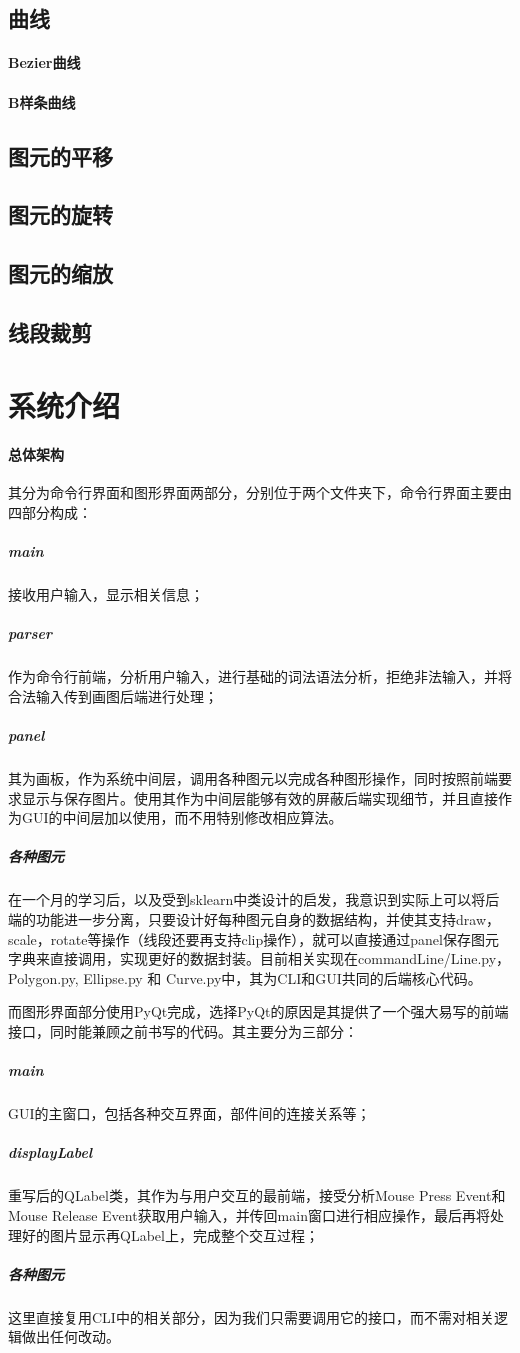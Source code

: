 \documentclass[a4paper,UTF8]{article}
\theoremstyle{definition}
\begin{document}
\subsection{曲线}
\paragraph{Bezier曲线}
\paragraph{B样条曲线}
\subsection{图元的平移}
\subsection{图元的旋转}
\subsection{图元的缩放}
\subsection{线段裁剪}
\section{系统介绍}
\paragraph{总体架构} 其分为命令行界面和图形界面两部分，分别位于两个文件夹下，命令行界面主要由四部分构成：
\subparagraph{main} 接收用户输入，显示相关信息；
\subparagraph{parser} 作为命令行前端，分析用户输入，进行基础的词法语法分析，拒绝非法输入，并将合法输入传到画图后端进行处理；
\subparagraph{panel} 其为画板，作为系统中间层，调用各种图元以完成各种图形操作，同时按照前端要求显示与保存图片。使用其作为中间层能够有效的屏蔽后端实现细节，并且直接作为GUI的中间层加以使用，而不用特别修改相应算法。
\subparagraph{各种图元} 在一个月的学习后，以及受到sklearn中类设计的启发，我意识到实际上可以将后端的功能进一步分离，只要设计好每种图元自身的数据结构，并使其支持draw，scale，rotate等操作（线段还要再支持clip操作），就可以直接通过panel保存图元字典来直接调用，实现更好的数据封装。目前相关实现在commandLine/Line.py，Polygon.py, Ellipse.py 和 Curve.py中，其为CLI和GUI共同的后端核心代码。
\par 而图形界面部分使用PyQt完成，选择PyQt的原因是其提供了一个强大易写的前端接口，同时能兼顾之前书写的代码。其主要分为三部分：
\subparagraph{main} GUI的主窗口，包括各种交互界面，部件间的连接关系等；
\subparagraph{displayLabel} 重写后的QLabel类，其作为与用户交互的最前端，接受分析Mouse Press Event和Mouse Release Event获取用户输入，并传回main窗口进行相应操作，最后再将处理好的图片显示再QLabel上，完成整个交互过程；
\subparagraph{各种图元} 这里直接复用CLI中的相关部分，因为我们只需要调用它的接口，而不需对相关逻辑做出任何改动。
\end{document}
